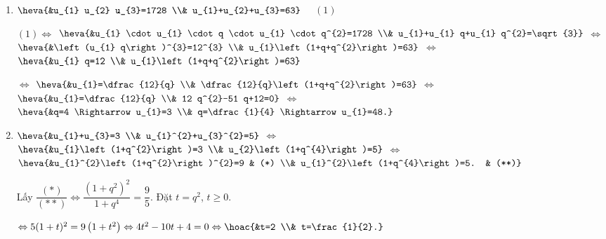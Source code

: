 \begin{vd}
{\begin{enumerate}
			$ (1) \Leftrightarrow$ $ \heva{&8 u_{1} q-5 \sqrt{5} u_{1} q^{4}=0 \\& u_{1}^{3}+\left(u_{1} q^{2}\right)^{3}=189} $ $ \Leftrightarrow $
			$ \heva{&8=5 \sqrt{5} q^{3} \Rightarrow q^{3}=\dfrac{8}{5 \sqrt{5}}=\left(\dfrac{2}{\sqrt{5}}\right)^{3} \Rightarrow q=\dfrac{2}{\sqrt{5}} \\& u_{1}^{3}\left(1+q^{6}\right)=189 \Rightarrow u_{1}^{3}=\dfrac{189}{1+q^{6}}=125 \Rightarrow u_{1}=5.} $
			\item $ \heva{&u_{1} u_{2} u_{3}=1728 \\& u_{1}+u_{2}+u_{3}=63} $ $ \quad (1) $
			
			$ (1) \Leftrightarrow $ $ \heva{&u_{1} \cdot u_{1} \cdot q \cdot u_{1} \cdot q^{2}=1728 \\& u_{1}+u_{1} q+u_{1} q^{2}=\sqrt{3}} $ $ \Leftrightarrow $
			$ \heva{&\left(u_{1} q\right)^{3}=12^{3} \\& u_{1}\left(1+q+q^{2}\right)=63} $ $ \Leftrightarrow $
			$ \heva{&u_{1} q=12 \\& u_{1}\left(1+q+q^{2}\right)=63} $
			
			$ \Leftrightarrow $ $ \heva{&u_{1}=\dfrac{12}{q} \\& \dfrac{12}{q}\left(1+q+q^{2}\right)=63} $ $ \Leftrightarrow $
			$ \heva{&u_{1}=\dfrac{12}{q} \\& 12 q^{2}-51 q+12=0} $ $ \Leftrightarrow $
			$ \heva{&q=4 \Rightarrow u_{1}=3 \\& q=\dfrac{1}{4} \Rightarrow u_{1}=48.} $
			\item $ \heva{&u_{1}+u_{3}=3 \\& u_{1}^{2}+u_{3}^{2}=5} $ $ \Leftrightarrow $
			$ \heva{&u_{1}\left(1+q^{2}\right)=3 \\& u_{2}\left(1+q^{4}\right)=5} $ $ \Leftrightarrow $
			$ \heva{&u_{1}^{2}\left(1+q^{2}\right)^{2}=9 & (*) \\& u_{1}^{2}\left(1+q^{4}\right)=5. & (**)} $
			
			Lấy $\dfrac{(*)}{(* *)} \Leftrightarrow \dfrac{\left(1+q^{2}\right)^{2}}{1+q^{4}}=\dfrac{9}{5}$. Đặt $t=q^{2}$, $t \geq 0$.
			
			$\Leftrightarrow 5(1+t)^{2}=9\left(1+t^{2}\right) \Leftrightarrow 4 t^{2}-10 t+4=0 \Leftrightarrow \hoac{&t=2 \\& t=\frac{1}{2}.}$
			

\end{enumerate}}
\end{vd}
